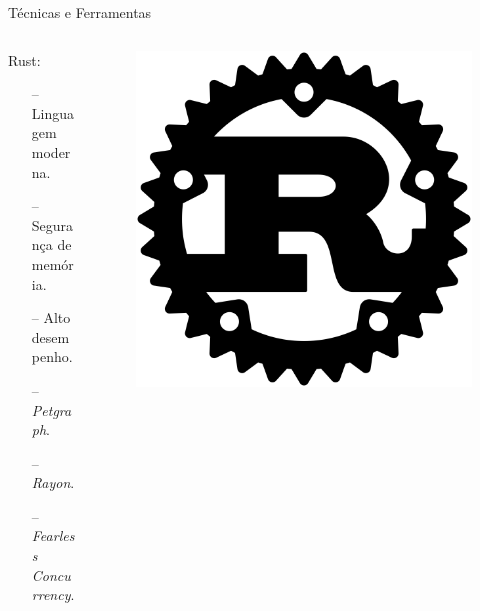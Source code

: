 \begin{frame}{Técnicas e Ferramentas}
    \begin{columns}
    \begin{column}{0.9\textwidth}
    Rust:
    \begin{itemize}
        \item[--] Linguagem moderna.
        \item[--] Segurança de memória.
        \item[--] Alto desempenho. 
        \item[--] \textit{Petgraph}.
        \item[--] \textit{Rayon}.
        \item[--] \textit{Fearless Concurrency}.
    \end{itemize}
    \end{column}

    \begin{column}{0.1\textwidth}
        \begin{figure}
            \includegraphics[width=\textwidth]{Figuras/Rust Logo.svg.png}
        \end{figure}
    \end{column}
    \end{columns}
\end{frame}

